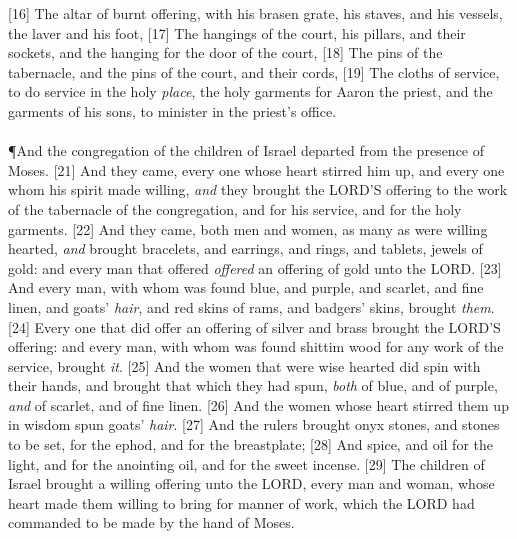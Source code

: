[16] \textcolor[cmyk]{0.99998,1,0,0}{The altar of burnt offering, with his brasen grate, his staves, and   his vessels, the laver and his foot,}
[17] \textcolor[cmyk]{0.99998,1,0,0}{The hangings of the court, his pillars, and their sockets, and the hanging for the door of the court,}
[18] \textcolor[cmyk]{0.99998,1,0,0}{The pins of the tabernacle, and the pins of the court, and their cords,}
[19] \textcolor[cmyk]{0.99998,1,0,0}{The cloths of service, to do service in the holy \emph{place}, the holy garments for Aaron the priest, and the garments of his sons, to minister in the priest's office.}\\
\\
\P \textcolor[cmyk]{0.99998,1,0,0}{And   the congregation of the children of Israel departed from the presence of Moses.}
[21] \textcolor[cmyk]{0.99998,1,0,0}{And they came, every one whose heart stirred him up, and every one whom his spirit made willing, \emph{and} they brought the LORD'S offering to the work of the tabernacle of the congregation, and for   his service, and for the holy garments.}
[22] \textcolor[cmyk]{0.99998,1,0,0}{And they came, both men and women, as many as were willing hearted, \emph{and} brought bracelets, and earrings, and rings, and tablets,   jewels of gold: and every man that offered \emph{offered} an offering of gold unto the LORD.}
[23] \textcolor[cmyk]{0.99998,1,0,0}{And every man, with whom was found blue, and purple, and scarlet, and fine linen, and goats' \emph{hair}, and red skins of rams, and badgers' skins, brought \emph{them}.}
[24] \textcolor[cmyk]{0.99998,1,0,0}{Every one that did offer an offering of silver and brass brought the LORD'S offering: and every man, with whom was found shittim wood for any work of the service, brought \emph{it}.}
[25] \textcolor[cmyk]{0.99998,1,0,0}{And   the women that were wise hearted did spin with their hands, and brought that which they had spun, \emph{both} of blue, and of purple, \emph{and} of scarlet, and of fine linen.}
[26] \textcolor[cmyk]{0.99998,1,0,0}{And   the women whose heart stirred them up in wisdom spun goats' \emph{hair}.}
[27] \textcolor[cmyk]{0.99998,1,0,0}{And the rulers brought onyx stones, and stones to be set, for the ephod, and for the breastplate;}
[28] \textcolor[cmyk]{0.99998,1,0,0}{And spice, and oil for the light, and for the anointing oil, and for the sweet incense.}
[29] \textcolor[cmyk]{0.99998,1,0,0}{The children of Israel brought a willing offering unto the LORD, every man and woman, whose heart made them willing to bring for   manner of work, which the LORD had commanded to be made by the hand of Moses.}\\
